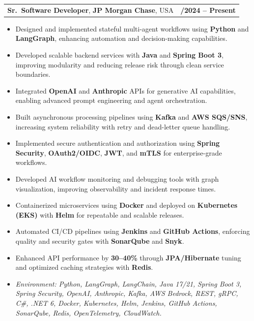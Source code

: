 \documentclass[letterpaper,11pt]{article}
\makeatletter
\newcommand{\resumeItem}[1]{
  \item\footnotesize{
    {#1 \vspace{-2pt}}
  }
}
\newcommand{\resumeSubheading}[4]{
  \vspace{-2pt}\item
    \begin{tabular*}{1.0\textwidth}[t]{l@{\extracolsep{\fill}}r}
      \textbf{\fontsize{10pt}{14pt}\selectfont #3}, \textbf{\fontsize{10pt}{14pt}\selectfont #1}, \fontsize{10pt}{14pt}\selectfont #4 & \textbf{\fontsize{10pt}{14pt}\selectfont #2} \\
    \end{tabular*}\vspace{-7pt}
}
\newcommand{\resumeItemListStart}{\begin{itemize}[leftmargin=*]}
\newcommand{\resumeItemListEnd}{\end{itemize}\vspace{-5pt}}
\makeatother
\begin{document}
\resumeSubheading
{JP Morgan Chase}{09/2024 -- Present}
{Sr.\ Software Developer}{USA}
\resumeItemListStart
  \resumeItem{Designed and implemented stateful multi-agent workflows using \textbf{Python} and \textbf{LangGraph}, enhancing automation and decision-making capabilities.}
  \resumeItem{Developed scalable backend services with \textbf{Java} and \textbf{Spring Boot 3}, improving modularity and reducing release risk through clean service boundaries.}
  \resumeItem{Integrated \textbf{OpenAI} and \textbf{Anthropic} APIs for generative AI capabilities, enabling advanced prompt engineering and agent orchestration.}
  \resumeItem{Built asynchronous processing pipelines using \textbf{Kafka} and \textbf{AWS SQS/SNS}, increasing system reliability with retry and dead-letter queue handling.}
  \resumeItem{Implemented secure authentication and authorization using \textbf{Spring Security}, \textbf{OAuth2/OIDC}, \textbf{JWT}, and \textbf{mTLS} for enterprise-grade workflows.}
  \resumeItem{Developed AI workflow monitoring and debugging tools with graph visualization, improving observability and incident response times.}
  \resumeItem{Containerized microservices using \textbf{Docker} and deployed on \textbf{Kubernetes (EKS)} with \textbf{Helm} for repeatable and scalable releases.}
  \resumeItem{Automated CI/CD pipelines using \textbf{Jenkins} and \textbf{GitHub Actions}, enforcing quality and security gates with \textbf{SonarQube} and \textbf{Snyk}.}
  \resumeItem{Enhanced API performance by \textbf{30--40\%} through \textbf{JPA/Hibernate} tuning and optimized caching strategies with \textbf{Redis}.}
  \resumeItem{\textit{Environment: Python, LangGraph, LangChain, Java 17/21, Spring Boot 3, Spring Security, OpenAI, Anthropic, Kafka, AWS Bedrock, REST, gRPC, C\#, .NET 6, Docker, Kubernetes, Helm, Jenkins, GitHub Actions, SonarQube, Redis, OpenTelemetry, CloudWatch.}}
\resumeItemListEnd
\end{document}
